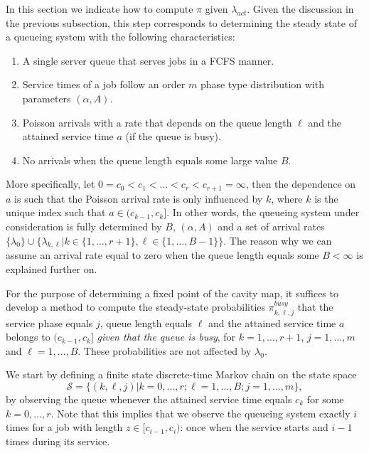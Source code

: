 \documentclass[12pt]{report}
\begin{document}
In this section we indicate how to compute $\pi$ given $\lambda_{act}$.
Given the discussion in the previous subsection, this step corresponds to determining the
steady state of a 
queueing system with the following characteristics:
\begin{enumerate}
\item A single server queue that serves jobs in a FCFS manner.
\item Service times of a job follow an order $m$ 
phase type distribution with parameters $(\alpha,A)$.
\item Poisson arrivals with a rate that depends on the queue length $\ell$ and
the attained service time $a$ (if the queue is busy).  
\item No arrivals when the queue length equals some large value $B$.
\end{enumerate}
More specifically, let $0 = c_0 < c_1 < \ldots < c_r < c_{r+1} = \infty$, then  
the dependence on $a$ is such that the Poisson arrival rate is only influenced by 
$k$, where $k$ is the unique index such that $a \in (c_{k-1},c_k]$.
In other words, the queueing system under consideration is fully determined by
$B$, $(\alpha,A)$ and a set of arrival rates $\{\lambda_0\} \cup \{ \lambda_{k,\ell} |
k \in \{1,\ldots,r+1\}, \ell \in \{1,\ldots,B-1\}\}$. The reason why we can assume
an arrival rate equal to zero when the queue length equals some $B < \infty$ is explained
further on. 

For the purpose of determining a fixed point of the cavity map, it suffices to 
develop a method to compute
the steady-state probabilities $\pi^{busy}_{k,\ell,j}$ that the 
service phase equals $j$, queue length equals $\ell$ and the attained service time $a$ 
belongs to $(c_{k-1},c_k]$ {\it given that the queue is busy}, for $k=1,\ldots,r+1$, $j=1,\ldots,m$
and $\ell =1,\ldots,B$. These probabilities are not affected by $\lambda_0$.

We start by defining a finite state discrete-time Markov chain on the state space
\[\mathcal{S} = \{(k,\ell,j) | k = 0,\ldots,r; \ell = 1,\ldots,B; j = 1,\ldots,m\},\]
by observing the queue whenever the attained service time equals $c_k$ for some $k=0,\ldots,r$. Note that this implies that we observe
the queueing system exactly $i$ times for a job with length $z \in [c_{i-1},c_i)$:
once when the service starts and $i-1$ times during its service.
\end{document}
